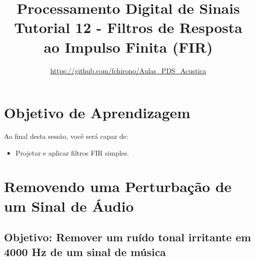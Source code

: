 \documentclass[a4paper,twoside,12pt]{article}
\title{\vspace{-2cm} Processamento Digital de Sinais\\ Tutorial 12 - Filtros de Resposta ao Impulso Finita (FIR)}
\author{\url{https://github.com/fchirono/Aulas_PDS_Acustica}}
\begin{document}
	\date{}
	\maketitle
	
	
	\section*{Objetivo de Aprendizagem}
	Ao final desta sessão, você será capaz de:
	\begin{itemize}
		\item Projetar e aplicar filtros FIR simples.
	\end{itemize}
	
	\begingroup
	\let\clearpage\relax
	\tableofcontents
	\endgroup
	
	\section{Removendo uma Perturbação de um Sinal de Áudio}
	
	\subsection*{Objetivo: Remover um ruído tonal irritante em 4000 Hz de um sinal de música}
	
\end{document}
